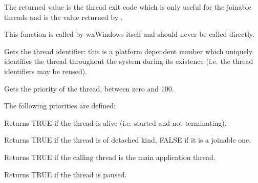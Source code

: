 The returned value is the thread exit code which is only useful for the
joinable threads and is the value returned by .

This function is called by wxWindows itself and should never be called
directly.

\label{wxthreadgetid}


Gets the thread identifier: this is a platform dependent number which uniquely identifies the
thread throughout the system during its existence (i.e. the thread identifiers may be reused).

\label{wxthreadgetpriority}


Gets the priority of the thread, between zero and 100.

The following priorities are defined:

\twocolwidtha{7cm}
\begin{twocollist}\itemsep=0pt
\end{twocollist}

\label{wxthreadisalive}


Returns TRUE if the thread is alive (i.e. started and not terminating).

\label{wxthreadisdetached}


Returns TRUE if the thread is of detached kind, FALSE if it is a joinable one.

\label{wxthreadismain}


Returns TRUE if the calling thread is the main application thread.

\label{wxthreadispaused}


Returns TRUE if the thread is paused.

\label{wxthreadisrunning}

